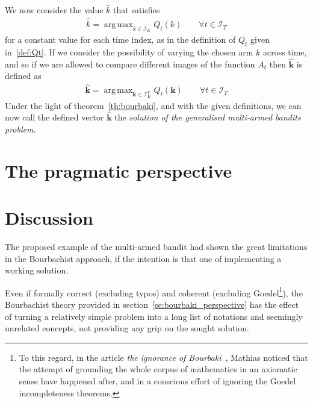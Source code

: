 \documentclass[]{scrartcl}
\DeclareMathOperator*{\argmax}{arg\,max}
\theoremstyle{definition}
\begin{document}
We now consider the value $\hat{k}$ that satisfies
\begin{align*}
\hat{k} = \argmax_{k \in \mathcal{I}_K} Q_t(k)
\qquad
\forall t \in \mathcal{I}_T
\end{align*}
for a constant value for each time index, as in the definition of $Q_t$ given in~\ref{def:Qt}. 
If we consider the possibility of varying the chosen arm $k$ across time, and so if we are allowed to compare different images of the function $A_t$ then $\hat{\mathbf{k}}$ is defined as
\begin{align}\label{eq:bourbaki_solution}
\hat{\mathbf{k}} 
= 
\argmax_{\mathbf{k} \in \mathcal{I}_K^{T}} Q_t(\mathbf{k})
\qquad
\forall t \in \mathcal{I}_T
\end{align}
Under the light of theorem~\ref{th:bourbaki}, and with the given definitions, we can now call the defined vector $\hat{\mathbf{k}}$ the \emph{solution of the generalised multi-armed bandits problem}.

\section{The pragmatic perspective}
\label{se:pragmatic_perspective}


\section{Discussion}
\label{se:outro}
The proposed example of the multi-armed bandit had shown the great limitations in the Bourbachist approach, if the intention is that one of implementing a working solution.

Even if formally correct (excluding typos) and coherent (excluding Goedel\footnote{
    To this regard, in the article \emph{the ignorance of Bourbaki}~\cite{mathias1992ignorance}, Mathias noticed that the attempt of grounding the whole corpus of mathematics in an axiomatic sense have happened after, and in a conscious effort of ignoring the Goedel incompleteness theorems.
}), the Bourbachist theory provided in section~\ref{se:bourbaki_perspective} has the effect of turning a relatively simple problem into a long list of notations and seemingly unrelated concepts, not providing any grip on the sought solution.
\end{document}
